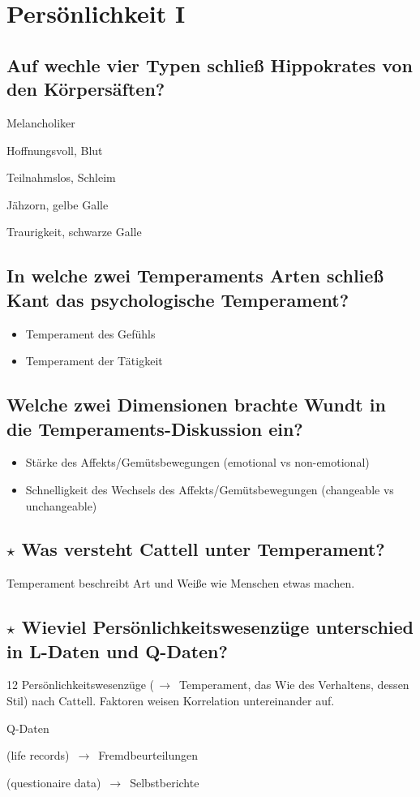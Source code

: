 \documentclass[a4paper,9pt,DIV=14]{scrartcl}
\begin{document}
\section{Persönlichkeit I}
\subsection{Auf wechle vier Typen schließ Hippokrates von den Körpersäften?}
    \begin{labeling}{Melancholiker}
        \item [Sanguiniker] Hoffnungsvoll, Blut
        \item [Phlegmatiker] Teilnahmslos, Schleim
        \item [Choleriker] Jähzorn, gelbe Galle
        \item [Melancholiker] Traurigkeit, schwarze Galle
    \end{labeling}
\subsection{In welche zwei Temperaments Arten schließ Kant das psychologische Temperament?}
    \begin{itemize}
        \item Temperament des Gefühls
        \item Temperament der Tätigkeit
    \end{itemize}
\subsection{Welche zwei Dimensionen brachte Wundt in die Temperaments-Diskussion ein?}
    \begin{itemize}
        \item Stärke des Affekts/Gemütsbewegungen (emotional vs non-emotional)
        \item Schnelligkeit des Wechsels des Affekts/Gemütsbewegungen (changeable vs unchangeable)
    \end{itemize}
\subsection{$\star$ Was versteht Cattell unter Temperament?} %
    Temperament beschreibt Art und Weiße wie Menschen etwas machen.
\subsection{$\star$ Wieviel Persönlichkeitswesenzüge unterschied in L-Daten und Q-Daten?} %
12 Persönlichkeitswesenzüge ($\,\to\,$ Temperament, das Wie des Verhaltens, dessen Stil) nach Cattell. Faktoren weisen Korrelation untereinander auf.
    \begin{labeling}{Q-Daten}
        \item [L-Daten] (life records) $\,\to\,$ Fremdbeurteilungen
        \item [Q-Daten] (questionaire data) $\,\to\,$ Selbstberichte
    \end{labeling}
\end{document}
